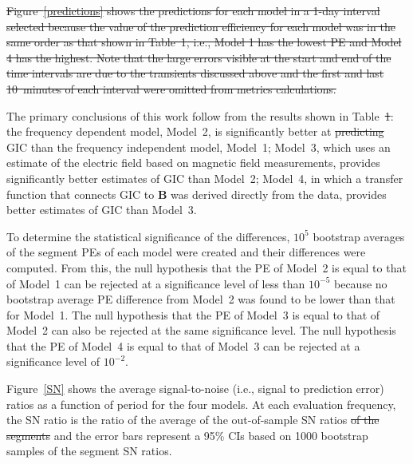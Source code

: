 \documentclass[draft,linenumbers]{agujournal2018}
\providecommand{\DIFaddtex}[1]{{\protect\color{blue}\uwave{#1}}} %
\providecommand{\DIFdeltex}[1]{{\protect\color{red}\sout{#1}}}                      %
\providecommand{\DIFaddbegin}{} %
\providecommand{\DIFaddend}{} %
\providecommand{\DIFdelbegin}{} %
\providecommand{\DIFdelend}{} %
\providecommand{\DIFadd}[1]{\texorpdfstring{\DIFaddtex{#1}}{#1}} %
\providecommand{\DIFdel}[1]{\texorpdfstring{\DIFdeltex{#1}}{}} %
\begin{document}
\DIFdelbegin \DIFdel{Figure~\ref{predictions} shows the predictions for each model in a 1-day interval selected because the value of the prediction efficiency for each model was in the same order as that shown in Table~1, i.e., Model 1 has the lowest PE and Model 4 has the highest. Note that the large errors visible at the start and end of the time intervals are due to the transients discussed above and the first and last 10~minutes of each interval were omitted from metrics calculations.
}%

\DIFdelend The primary conclusions of this work follow from the results shown in Table~\DIFdelbegin \DIFdel{1}\DIFdelend \DIFaddbegin \DIFadd{\ref{resultstable}}\DIFaddend : the frequency dependent model, Model~2, is significantly better at \DIFdelbegin \DIFdel{predicting }\DIFdelend \DIFaddbegin \DIFadd{estimating }\DIFaddend GIC than the frequency independent model, Model~1; Model~3, which uses an estimate of the electric field based on magnetic field measurements, provides significantly better estimates of GIC than Model~2; Model~4, in which a transfer function that connects GIC to $\mathbf{B}$ was derived directly from the data, provides better estimates of GIC than Model~3.

To determine the statistical significance of the \DIFaddbegin \DIFadd{PE }\DIFaddend differences, $10^5$ bootstrap averages of the segment PEs of each model were created and their differences were computed. From this, the null hypothesis that the PE of Model~2 is equal to that of Model~1 can be rejected at a significance level of less than $10^{-5}$ because no bootstrap average PE difference from Model~2 was found to be lower than that for Model~1. The null hypothesis that the PE of Model~3 is equal to that of Model~2 can also be rejected at the same significance level. The null hypothesis that the PE of Model~4 is equal to that of Model~3 can be rejected at a significance level of $10^{-2}$.

\DIFdelbegin %

\DIFdelend Figure~\ref{SN} shows the average signal-to-noise (i.e., signal to prediction error) ratios as a function of period for the four models. At each evaluation frequency, the SN ratio is the ratio of the average of the out-of-sample SN ratios \DIFdelbegin \DIFdel{of the segments }\DIFdelend and the error bars represent a 95\% CIs based on 1000 bootstrap samples of the segment SN ratios. \DIFdelbegin %
\end{document}
